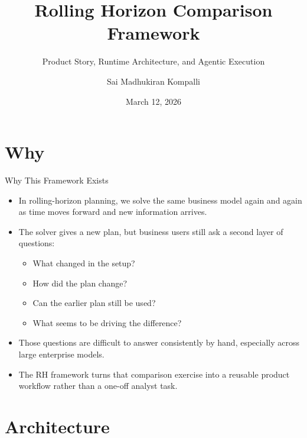 \documentclass[10pt]{beamer}
\title[Rolling Horizon Comparison Framework]{Rolling Horizon Comparison Framework}
\subtitle{Product Story, Runtime Architecture, and Agentic Execution}
\author{Sai Madhukiran Kompalli}
\date{March 12, 2026}
\begin{document}
\begin{frame}
  \titlepage
\end{frame}

\section{Why}

\begin{frame}{Why This Framework Exists}
  \begin{itemize}
    \item In rolling-horizon planning, we solve the same business model again and again as time moves forward and new information arrives.
    \item The solver gives a new plan, but business users still ask a second layer of questions:
    \begin{itemize}
      \item What changed in the setup?
      \item How did the plan change?
      \item Can the earlier plan still be used?
      \item What seems to be driving the difference?
    \end{itemize}
    \item Those questions are difficult to answer consistently by hand, especially across large enterprise models.
    \item The RH framework turns that comparison exercise into a reusable product workflow rather than a one-off analyst task.
  \end{itemize}
\end{frame}

\section{Architecture}
\end{document}
